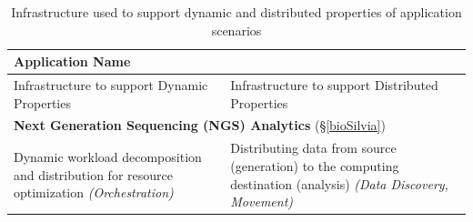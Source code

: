 \begin{table}[h]
  \begin{scriptsize}
    \begin{center}
      \caption{Infrastructure used to support dynamic and distributed
        properties of application scenarios %
      }
      \label{tab:inf_app_mapping}
      \begin{tabular}{|p{6.7cm}|p{6.7cm}|}

\hline	
\multicolumn{2}{|l|}{{\textbf{Application Name}}} \\ \hline	
Infrastructure to support Dynamic Properties & Infrastructure to support Distributed Properties
 \\ \hline
		\hline	
\multicolumn{2}{|l|}{{\textbf{Next Generation Sequencing (NGS) Analytics} (\S\ref{bioSilvia})}} \\ \hline	
Dynamic workload decomposition and distribution for resource optimization \emph{(Orchestration)}
		&
Distributing data from source (generation) to the computing destination (analysis) \emph{(Data
  Discovery, Movement)}

\end{tabular}
\end{center}
\end{scriptsize}
\end{table}
